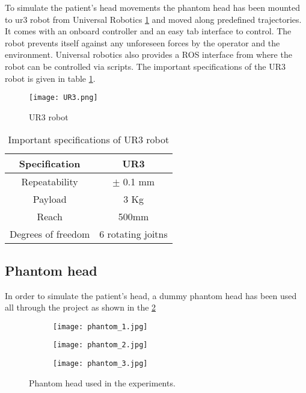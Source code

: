 To simulate the patient's head movements the phantom head has been mounted to ur3 robot from Universal Robotics \cref{fig:ur3} and moved along predefined trajectories. It comes with an onboard controller and an easy tab interface to control. The robot prevents itself against any unforeseen forces by the operator and the environment. Universal robotics also provides a ROS interface from where the robot can be controlled via scripts. The important specifications of the UR3 robot is given in table \ref{tab:UR3 specification}.

\begin{figure}[hbt!]
	\centering
		\texttt{[image: UR3.png]}
		\caption{UR3 robot \cite{UR3}}
		\label{fig:ur3}	
\end{figure}

\begin{table}[hbt]
	\centering
	\begin{tabular}{|c|c|}
		\hline
		Specification & UR3\\ 
		\hline
		Repeatability & $\pm$ 0.1 mm\\
		Payload & 3 Kg\\
		Reach & 500mm \\
		Degrees of freedom & 6 rotating joitns\\
		\hline
	\end{tabular}
	\caption{Important specifications of UR3 robot}
	\label{tab:UR3 specification}
\end{table}

\subsection{Phantom head}
In order to simulate the patient's head, a dummy phantom head has been used all through the project as shown in the \cref{fig:Phantom_head}  

\begin{figure}[hbt!]
	\centering
	\begin{subfigure}{0.32\textwidth}
		\texttt{[image: phantom\_1.jpg]}	
	\end{subfigure}
	\hfill
	\begin{subfigure}{0.32\textwidth}
		\texttt{[image: phantom\_2.jpg]}	
	\end{subfigure}
	\hfill
	\begin{subfigure}{0.32\textwidth}
		\texttt{[image: phantom\_3.jpg]}	
	\end{subfigure}
	\caption{Phantom head used in the experiments.} 
	\label{fig:Phantom_head}
\end{figure} 


